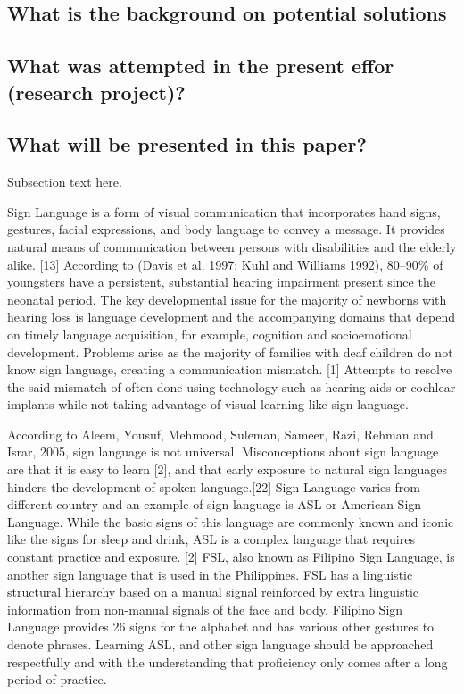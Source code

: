 \documentclass[journal]{./IEEE/IEEEtran}
\begin{document}
\subsection{What is the background on potential solutions}

\subsection{What was attempted in the present effor (research project)?}

\subsection{What will be presented in this paper?}
Subsection text here.
\par
Sign Language is a form of visual communication that incorporates hand signs, gestures, facial expressions, and body language to convey a message. It provides natural means of communication between persons with disabilities and the elderly alike. [13] According to (Davis et al. 1997; Kuhl and Williams 1992), 80–90\% of youngsters have a persistent, substantial hearing impairment present since the neonatal period. The key developmental issue for the majority of newborns with hearing loss is language development and the accompanying domains that depend on timely language acquisition, for example, cognition and socioemotional development. Problems arise as the majority of families with deaf children do not know sign language, creating a communication mismatch. [1] Attempts to resolve the said mismatch of often done using technology such as hearing aids or cochlear implants while not taking advantage of visual learning like sign language.
\par
According to Aleem, Yousuf, Mehmood, Suleman, Sameer, Razi, Rehman and Israr, 2005, sign language is not universal. Misconceptions about sign language are that it is easy to learn [2], and that early exposure to natural sign languages hinders the development of spoken language.[22] Sign Language varies from different country and an example of sign language is ASL or American Sign Language. While the basic signs of this language are commonly known and iconic like the signs for sleep and drink, ASL is a complex language that requires constant practice and exposure. [2] FSL, also known as Filipino Sign Language, is another sign language that is used in the Philippines. FSL has a linguistic structural hierarchy based on a manual signal reinforced by extra linguistic information from non-manual signals of the face and body. Filipino Sign Language provides 26 signs for the alphabet and has various other gestures to denote phrases. Learning ASL, and other sign language should be approached respectfully and with the understanding that proficiency only comes after a long period of practice.
\end{document}
